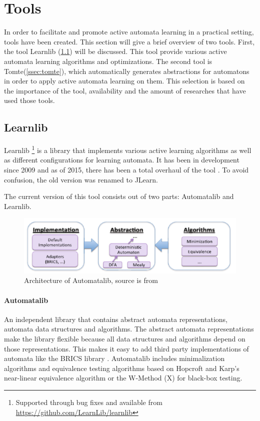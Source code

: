 \documentclass[multi,crop=false,class=article]{standalone}
\begin{document}
\section{Tools}
\label{sec:tools}

In order to facilitate and promote active automata learning in a practical
setting, tools have been created. This section will give a brief overview of two
tools. First, the tool Learnlib (\ref{ssec:learnlib}) will be discussed. This
tool provide various active automata learning algorithms and optimizations. The
second tool is Tomte(\ref{ssec:tomte}), which automatically generates
abstractions for automatons in order to apply active automata learning on them.
This selection is based on the importance of the tool, availability and the
amount of researches that have used those tools.

\subsection{Learnlib}
\label{ssec:learnlib}

Learnlib \footnote{Supported through bug fixes and available from
\url{https://github.com/LearnLib/learnlib}} is a library that implements various
active learning algorithms as well as different configurations for learning
automata. It has been in development since 2009 \cite{Raffelt2009} and as of
2015, there has been a total overhaul of the tool \cite{Isberner2015b}. To avoid
confusion, the old version was renamed to JLearn.

The current version of this tool consists out of two parts: Automatalib and
Learnlib.

\begin{figure}[!ht]
	\includegraphics[width=\textwidth]{Tool_images/automatalib_architecture.png}
	\caption{Architecture of Automatalib, source is from \cite{Isberner2015b}}
	\label{fig:automatalib_arch}
\end{figure}

\paragraph{Automatalib} An independent library that contains abstract automata
representations, automata data structures and algorithms. The abstract automata
representations make the library flexible because all data structures and
algorithms depend on those representations. This makes it easy to add third
party implementations of automata like the BRICS library \cite{Alur2005}.
Automatalib includes minimalization algorithms and equivalence testing
algorithms based on Hopcroft and Karp's near-linear equivalence algorithm
\cite{Hopcroft1971} or the W-Method (X) 
for black-box testing.
\end{document}
